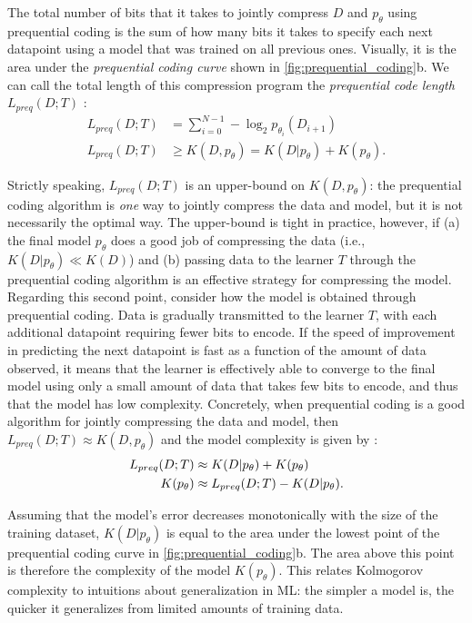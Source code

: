 \documentclass{article}
\begin{document}
\begin{appendices}
The total number of bits that it takes to jointly compress $D$ and $p_\theta$ using prequential coding is the sum of how many bits it takes to specify each next datapoint using a model that was trained on all previous ones. Visually, it is the area under the \textit{prequential coding curve} shown in \cref{fig:prequential_coding}b. We can call the total length of this compression program the \textit{prequential code length} $L_{preq}(D ; T)$ \citep{blier2018description}:
\begin{align}
    \label{eq:L_preq}
    L_{preq}(D ; T) &= \sum_{i=0}^{N-1} -\log_2 p_{\theta_i}(D_{i+1}) \\
    \label{eq:L_preq_K_relation}
    L_{preq}(D ; T) &\ge K(D, p_\theta) = K(D|p_\theta) + K(p_\theta) .
\end{align}

Strictly speaking, $L_{preq}(D ; T)$ is an upper-bound on $K(D, p_\theta)$: the prequential coding algorithm is \emph{one} way to jointly compress the data and model, but it is not necessarily the optimal way. The upper-bound is tight in practice, however, if (a) the final model $p_\theta$ does a good job of compressing the data (i.e., $K(D|p_\theta) \ll K(D)$) and (b) passing data to the learner $T$ through the prequential coding algorithm is an effective strategy for compressing the model. Regarding this second point, consider how the model is obtained through prequential coding. Data is gradually transmitted to the learner $T$, with each additional datapoint requiring fewer bits to encode. If the speed of improvement in predicting the next datapoint is fast as a function of the amount of data observed, it means that the learner is effectively able to converge to the final model using only a small amount of data that takes few bits to encode, and thus that the model has low complexity. Concretely, when prequential coding is a good algorithm for jointly compressing the data and model, then $L_{preq}(D ; T) \approx K(D, p_\theta)$ and the model complexity is given by \citep{blier2018description}:
\begin{align}
    L_{preq}(D ; T) &\approx K(D|p_\theta) + K(p_\theta) \notag \\
    K(p_\theta) &\approx L_{preq}(D ; T) - K(D|p_\theta) .
\end{align}

Assuming that the model's error decreases monotonically with the size of the training dataset, $K(D|p_\theta)$ is equal to the area under the lowest point of the prequential coding curve in \cref{fig:prequential_coding}b. The area above this point is therefore the complexity of the model $K(p_\theta)$. This relates Kolmogorov complexity to intuitions about generalization in ML: the simpler a model is, the quicker it generalizes from limited amounts of training data.



\end{appendices}
\end{document}
